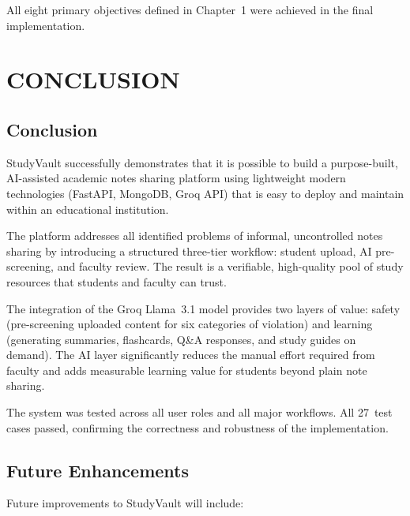 \documentclass{sgcproject}
\begin{document}
All eight primary objectives defined in Chapter~1 were achieved in the final implementation.

\chapter{CONCLUSION}

\section{Conclusion}

StudyVault successfully demonstrates that it is possible to build a purpose-built, AI-assisted academic notes sharing platform using lightweight modern technologies (FastAPI, MongoDB, Groq API) that is easy to deploy and maintain within an educational institution.

The platform addresses all identified problems of informal, uncontrolled notes sharing by introducing a structured three-tier workflow: student upload, AI pre-screening, and faculty review. The result is a verifiable, high-quality pool of study resources that students and faculty can trust.

The integration of the Groq Llama~3.1 model provides two layers of value: safety (pre-screening uploaded content for six categories of violation) and learning (generating summaries, flashcards, Q\&A responses, and study guides on demand). The AI layer significantly reduces the manual effort required from faculty and adds measurable learning value for students beyond plain note sharing.

The system was tested across all user roles and all major workflows. All 27~test cases passed, confirming the correctness and robustness of the implementation.

\section{Future Enhancements}

Future improvements to StudyVault will include:
\end{document}
